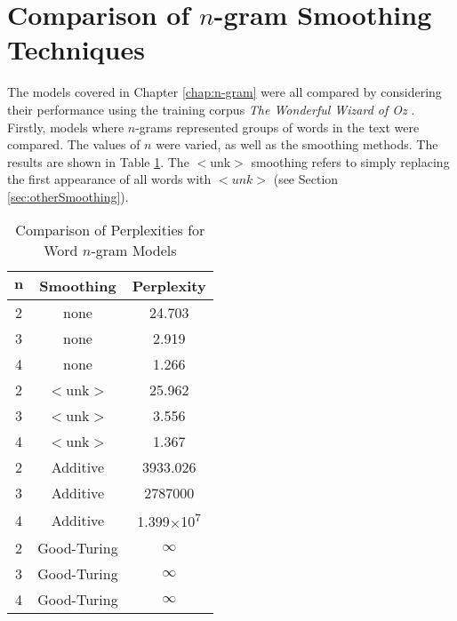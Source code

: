 %



\section{Comparison of $n$-gram Smoothing Techniques}

The models covered in Chapter \ref{chap:n-gram} were all compared by considering their performance using the training corpus \textit{The Wonderful Wizard of Oz} \cite{baum2008wonderful}. Firstly, models where $n$-grams represented groups of words in the text were compared. The values of $n$ were varied, as well as the smoothing methods. The results are shown in Table \ref{table:wordNGram}. The $<$unk$>$ smoothing refers to simply replacing the first appearance of all words with $<unk>$ (see Section \ref{sec:otherSmoothing}).

\begin{table}[h!]
\caption{Comparison of Perplexities for Word $n$-gram Models}
\label{table:wordNGram}
\begin{center}
    \begin{tabular}{|c| c| c|}
    \hline
    $\boldsymbol{n}$ & \textbf{Smoothing} & \textbf{Perplexity} \\ \hline
    2 & none & 24.703 \\ \hline
    3 & none & 2.919 \\ \hline
    4 & none & 1.266 \\ \hline
    2 & $<$unk$>$ & 25.962 \\ \hline
    3 & $<$unk$>$ & 3.556 \\ \hline
    4 & $<$unk$>$ & 1.367 \\ \hline
    2 & Additive & 3933.026 \\ \hline
    3 & Additive & 2787000 \\ \hline
    4 & Additive & 1.399$\times$10\textsuperscript{7} \\ \hline
    2 & Good-Turing & $\infty$ \\ \hline
    3 & Good-Turing & $\infty$ \\ \hline
    4 & Good-Turing& $\infty$ \\ \hline
    \end{tabular}
    \end{center}
    \end{table}

